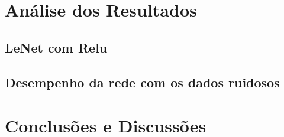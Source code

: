\documentclass[conference]{IEEEtran}
\begin{document}
\section{Análise dos Resultados}
\subsection{LeNet com Relu}

\subsection{Desempenho da rede com os dados ruidosos}



\section{Conclusões e Discussões}



\nocite{*}

\end{document}
